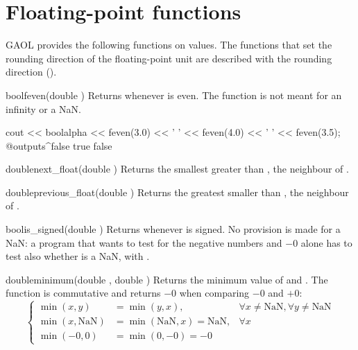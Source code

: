 \documentclass[12pt,a4paper,twoside,openright]{book}
\begin{document}
\section{Floating-point functions}\label{sec:fp-functions}
%

GAOL provides the following functions on  values. The functions
that set the rounding direction of the floating-point unit are described with
the rounding direction ().

\begin{deffun}{bool}{feven}{(double )}
  Returns  whenever  is even. The function is not meant for
  an infinity or a NaN.

  \begin{example}
cout << boolalpha << feven(3.0) << ' ' << feven(4.0) << ' ' << feven(3.5);
@outputs^false true false~
  \end{example}
\end{deffun}

\begin{deffun}{double}{next\_float}{(double )}
  Returns the smallest  greater than , the neighbour
   of .
\end{deffun}

\begin{deffun}{double}{previous\_float}{(double )}
  Returns the greatest  smaller than , the neighbour
   of .
\end{deffun}

\begin{deffun}{bool}{is\_signed}{(double )}
  Returns  whenever  is signed. No provision is made for a
  NaN: a program that wants to test for the negative numbers and $-0$ alone
  has to test also whether  is a NaN, with .
\end{deffun}

\begin{deffun}{double}{minimum}{(double , double )}
  Returns the minimum  value of  and . The
  function is commutative and returns $-0$ when comparing $-0$ and $+0$:
\begin{equation*}
\left\{\begin{array}{lll}
  \min(x,y) &=\min(y,x), &\forall x\neq\text{NaN}, \forall y\neq\text{NaN}\\
  \min(x,\text{NaN}) &=\min(\text{NaN},x)=\text{NaN}, &\forall x\\
  \min(-0,0) &=\min(0,-0)=-0
\end{array}\right.
\end{equation*}
\end{deffun}
\end{document}
